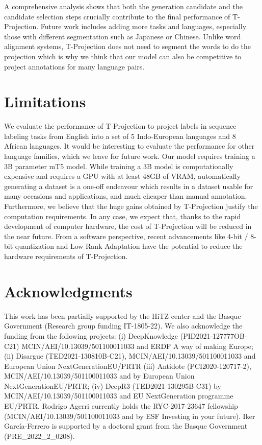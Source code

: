 \documentclass[11pt]{article}
\begin{document}
A comprehensive analysis shows that both the generation candidate and the candidate
selection steps crucially contribute to the final performance of T-Projection. 
Future work includes adding more tasks and languages, especially those with different
segmentation such as Japanese or Chinese. Unlike word alignment systems,
T-Projection does not need to segment the words to do the projection which is
why we think that our model can also be competitive to project annotations for
many language pairs.

\section*{Limitations}

We evaluate the performance of T-Projection to project labels in sequence
labeling tasks from English into a set of 5 Indo-European languages and 8 African languages. It would
be interesting to evaluate the performance for other language families,
which we leave for future work. Our model requires training a 3B parameter mT5 model. While training a 3B model is computationally expensive
and requires a GPU with at least 48GB of VRAM, automatically generating a dataset is a
one-off endeavour which results in a dataset usable for many occasions and
applications, and much cheaper than manual annotation. Furthermore, we believe that the huge gains obtained by T-Projection justify the computation requirements. In any case, we expect that, thanks to the rapid development of computer hardware, the cost of T-Projection will be reduced in the near future. From a software perspective, recent advancements like 4-bit / 8-bit quantization \cite{DBLP:conf/iclr/DettmersLSZ22,DBLP:journals/corr/abs-2208-07339,DBLP:journals/corr/abs-2210-17323}  and Low Rank Adaptation \cite{DBLP:conf/iclr/HuSWALWWC22} have the potential to reduce the hardware requirements of T-Projection. 

\section*{Acknowledgments}

This work has been partially supported by the HiTZ center and the Basque
Government (Research group funding IT-1805-22). We also acknowledge the funding
from the following projects: (i) DeepKnowledge (PID2021-127777OB-C21)
MCIN/AEI/10.13039/501100011033 and ERDF A way of making Europe; (ii) Disargue
(TED2021-130810B-C21), MCIN/AEI/10.13039/501100011033 and European Union
NextGenerationEU/PRTR (iii) Antidote (PCI2020-120717-2),
MCIN/AEI/10.13039/501100011033 and by European Union NextGenerationEU/PRTR;
(iv) DeepR3 (TED2021-130295B-C31) by MCIN/AEI/10.13039/501100011033 and
EU NextGeneration programme EU/PRTR.  Rodrigo Agerri currently holds the
RYC-2017-23647 fellowship (MCIN/AEI/10.13039/501100011033 and by ESF Investing
in your future). Iker García-Ferrero is supported by a doctoral grant from the Basque Government (PRE\_2022\_2\_0208).
\end{document}
